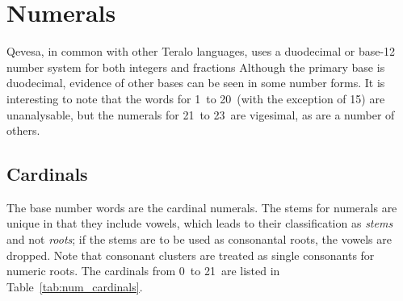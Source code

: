 \documentclass[grammar]{subfiles}
\begin{document}
	\chapter{Numerals}
	\label{ch:numerals}

	Qevesa, in common with other Teralo languages, uses a duodecimal or base-12 number system for both integers and fractions Although the primary base is duodecimal, evidence of other bases can be seen in some number forms. It is interesting to note that the words for 1\dec\ to 20\dec\ (with the exception of 15\dec) are unanalysable, but the numerals for 21\dec\ to 23\dec\ are vigesimal\footnotemark{}, as are a number of others.

	\section{Cardinals}
	\label{sec:num_cardinals}

	The base number words are the cardinal numerals. The stems for numerals are unique in that they include vowels, which leads to their classification as \emph{stems} and not \emph{roots}; if the stems are to be used as consonantal roots, the vowels are dropped. Note that consonant clusters are treated as single consonants for numeric roots. The cardinals from 0\dec\ to 21\dec\ are listed in Table~\ref{tab:num_cardinals}.

	\begin{table}[htpb]\small\capstart
		\begin{center}
			\qquad
			\caption{Cardinal numerals from 0\dec\ to 21\dec\label{tab:num_cardinals}}
		\end{center}
	\end{table}
\end{document}

